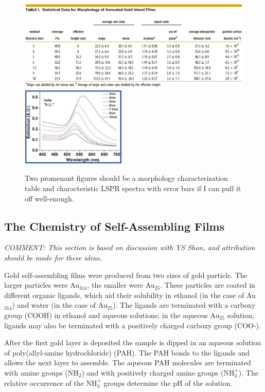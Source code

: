 \documentclass[12pt,oneside,english]{article}
\begin{document}
    \begin{figure}
        \includegraphics[width=120mm]{images/2011_Kedem_morphology.eps}
        \includegraphics[width=50mm]{images/2011_Kedem_spectroscopy.eps}
        \caption{Two promenant figures should be a morphology characterization table and characteristic LSPR spectra with error bars if I can pull it off well-enough.}
    \end{figure}


    \subsection{The Chemistry of Self-Assembling Films}

    \emph{COMMENT: This section is based on discussion with YS Shon, and attribution should be made for these ideas.}
    
    Gold self-assembling films were produced from two sizes of gold particle.  
    The larger particles were Au$_{314}$, the smaller were Au$_{25}$.  
    These particles are coated in different organic ligands, which aid their solubility in ethanol (in the case of Au$_{314}$) and water (in the case of Au$_{25}$).    
    The ligands are terminated with a carboxy group (COOH) in ethanol and aqueous solutions; in the aqueous Au$_{25}$ solution, ligands may also be terminated with a positively charged carboxy group (COO-). 
    
    After the first gold layer is deposited the sample is dipped in an aqueous solution of poly(allyl-amine hydrochloride) (PAH).  
    The PAH bonds to the ligands and allows the next layer to assemble.      
    The aqueous PAH molecules are terminated with amine groups (NH$_2$) and with positively charged amine groups (NH$_3^+$).  
    The relative occurrence of the NH$_3^+$ groups determine the pH of the solution.
    
\end{document}
